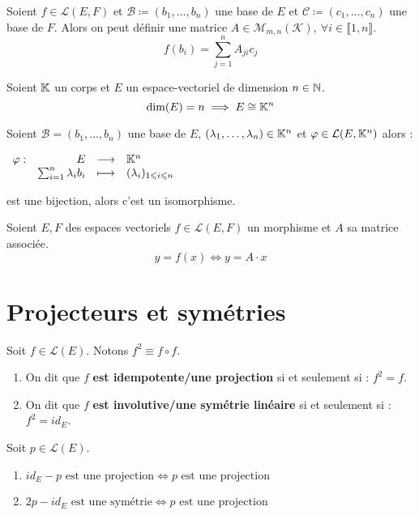 \begin{definition}
    Soient $f \in \mathcal{L}(E, F)$ et $\mathcal{B} \coloneqq (b_1, \ldots, b_n)$ une base de $E$ et $\mathcal{C} \coloneqq (c_1, \ldots, c_n)$ une base de $F$.
    Alors on peut définir une matrice $A \in \mathcal{M}_{m,n}(\mathcal{K}),\ \forall i \in \llbracket 1, n \rrbracket$. 
    \[ f(b_i) = \sum_{j = 1}^{n} A_{ji} c_j \]
\end{definition}

\begin{lemma} Soient $\mathbb{K}$ un corps et $E$ un espace-vectoriel de dimension $n \in \mathbb{N}$.
    \[ \dim(E) = n \implies E \cong \mathbb{K}^n \]
\end{lemma}

\begin{lemma}
    Soient $\mathcal{B} = (b_1, \ldots, b_n)$ une base de $E$, $(\lambda_1, \ldots, \lambda_n) \in \mathbb{K}^n$ et $\varphi \in \mathcal{L}(E, \mathbb{K}^n)$  alors :
    \begin{center}
    	$
    	\begin{array}{rrcl} \varphi : & E & \longrightarrow & \mathbb{K}^n \\ & \sum_{i = 1}^{n} \lambda_i b_i & \longmapsto & (\lambda_i)_{1 \leqslant i \leqslant n} \end{array}
    	$
    \end{center}
    est une bijection, alors c'est un isomorphisme.
\end{lemma}

\begin{proposition}
    Soient $E, F$ des espaces vectoriels $f \in \mathcal{L}(E, F)$ un morphisme et $A$ sa matrice associée. 
    \[ y = f(x) \iff y = A \cdot x \]
\end{proposition}

\section{Projecteurs et symétries}
\begin{definition}
    Soit $f \in \mathcal{L}(E)$. Notons $f^2 \equiv f \circ f$.
    \begin{enumerate}
        \item On dit que $f$ \textbf{est idempotente/une projection} si et seulement si : $f^2 = f$.
        \item On dit que $f$ \textbf{est involutive/une symétrie linéaire} si et seulement si : $f^2 = id_E$.
    \end{enumerate}
\end{definition}

\begin{proposition} 
    Soit $p \in \mathcal{L}(E)$.
    \begin{enumerate}
        \item $id_E - p \text{ est une projection} \iff p \text{ est une projection}$
        \item $2p - id_E \text{ est une symétrie} \iff p \text{ est une projection}$
    \end{enumerate}
\end{proposition}

